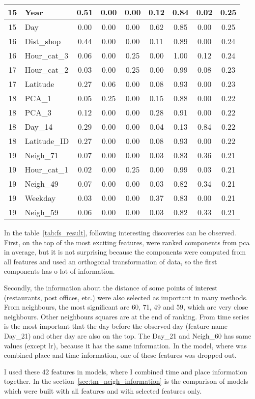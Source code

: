 \documentclass[thesis=M,english]{FITthesis}[2012/10/20]
\begin{document}
\begin{table}
\begin{scriptsize}
\begin{tabular}{|c|l|c|c|c|c|c|c|c|}
15 & Year & 0.51 & 0.00 & 0.00 & 0.12 & 0.84 & 0.02 & 0.25\tabularnewline\hline 
15 & Day & 0.00 & 0.00 & 0.00 & 0.62 & 0.85 & 0.00 & 0.25\tabularnewline\hline 
16 & Dist\_shop & 0.44 & 0.00 & 0.00 & 0.11 & 0.89 & 0.00 & 0.24\tabularnewline\hline 
16 & Hour\_cat\_3 & 0.06 & 0.00 & 0.25 & 0.00 & 1.00 & 0.12 & 0.24\tabularnewline\hline 
17 & Hour\_cat\_2 & 0.03 & 0.00 & 0.25 & 0.00 & 0.99 & 0.08 & 0.23\tabularnewline\hline 
17 & Latitude & 0.27 & 0.06 & 0.00 & 0.08 & 0.93 & 0.00 & 0.23\tabularnewline\hline 
18 & PCA\_1 & 0.05 & 0.25 & 0.00 & 0.15 & 0.88 & 0.00 & 0.22\tabularnewline\hline 
18 & PCA\_3 & 0.12 & 0.00 & 0.00 & 0.28 & 0.91 & 0.00 & 0.22\tabularnewline\hline 
18 & Day\_14 & 0.29 & 0.00 & 0.00 & 0.04 & 0.13 & 0.84 & 0.22\tabularnewline\hline 
18 & Latitude\_ID & 0.27 & 0.00 & 0.00 & 0.08 & 0.93 & 0.00 & 0.22\tabularnewline\hline 
19 & Neigh\_71 & 0.07 & 0.00 & 0.00 & 0.03 & 0.83 & 0.36 & 0.21\tabularnewline\hline 
19 & Hour\_cat\_1 & 0.02 & 0.00 & 0.25 & 0.00 & 0.99 & 0.03 & 0.21\tabularnewline\hline 
19 & Neigh\_49 & 0.07 & 0.00 & 0.00 & 0.03 & 0.82 & 0.34 & 0.21\tabularnewline\hline 
19 & Weekday & 0.03 & 0.00 & 0.00 & 0.37 & 0.83 & 0.00 & 0.21\tabularnewline\hline 
19 & Neigh\_59 & 0.06 & 0.00 & 0.00 & 0.03 & 0.82 & 0.33 & 0.21\tabularnewline\hline 
    \end{tabular}
    \end{scriptsize}
\end{table}

In the table~\ref{tab:fs_result}, following interesting discoveries can be observed. First, on the top of the most exciting features, were ranked components from \gls{pca} in average, but it is not surprising because the components were computed from all features and used an orthogonal transformation of data, so the first components has o lot of information. 

Secondly, the information about the distance of some points of interest (restaurants, post offices, etc.) were also selected as important in many methods. From neighbours, the most significant are 60, 71, 49 and 59, which are very close neighbours. Other neighbours squares are at the end of ranking. From time series is the most important that the day before the observed day (feature name Day\_21) and other day are also on the top. The Day\_21 and Neigh\_60 has same values (except \gls{lr}), because it has the same information. In the model, where was combined place and time information, one of these features was dropped out.

I used these 42 features in models, where I combined time and place information together. In the section~\ref{sec:tm_neigh_information} is the comparison of models which were built with all features and with selected features only.
\end{document}
